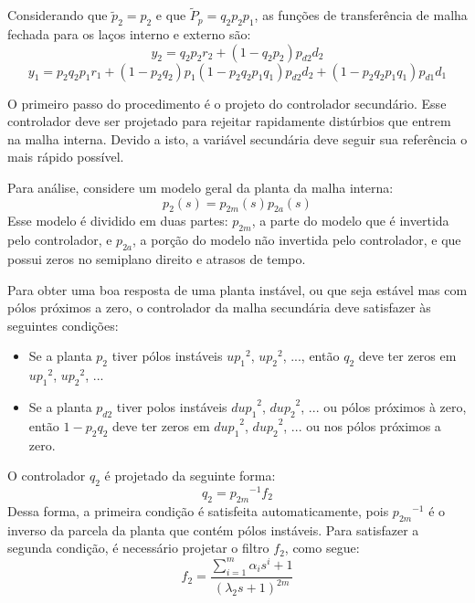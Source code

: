   Considerando que $\tilde{p}_2 = p_2$ e que $\tilde{P}_p = q_2 p_2 p_1$, as funções de transferência de malha fechada para os laços interno e externo são:
  \begin{equation}
    y_2 = q_2 p_2 r_2 + \left( 1- q_2 p_2 \right) p_{d2} d_2
  \end{equation}
  \begin{equation}
    y_1 = p_2 q_2 p_1 r_1 + \left( 1 - p_2 q_2 \right) p_1 \left(
      1 - p_2 q_2 p_1 q_1 \right) p_{d2} d_2 + \left( 1 - p_2 q_2 p_1 q_1
      \right) p_{d1} d_1
  \end{equation}

  O primeiro passo do procedimento é o projeto do controlador secundário. Esse controlador deve ser projetado para rejeitar rapidamente distúrbios que entrem na malha interna. Devido a isto, a variável secundária deve seguir sua referência o mais rápido possível.

  Para análise, considere um modelo geral da planta da malha interna:
  \begin{equation}
    p_2(s) = p_{2m}(s) p_{2a}(s)
  \end{equation}
  Esse modelo é dividido em duas partes: $p_{2m}$, a parte do modelo que é invertida pelo controlador, e $p_{2a}$, a porção do modelo não invertida pelo controlador, e que possui zeros no semiplano direito e atrasos de tempo.

  Para obter uma boa resposta de uma planta instável, ou que seja estável mas com pólos próximos a zero, o controlador da malha secundária deve satisfazer às seguintes condições:
  \begin{itemize}
    \item Se a planta $p_2$ tiver pólos instáveis
    	${up_1}^2$, ${up_2}^2$, ..., então $q_2$ deve ter zeros em
    	${up_1}^2$, ${up_2}^2$, ...
    \item Se a planta $p_{d2}$ tiver polos instáveis
    	${dup_1}^2$, ${dup_2}^2$, ... ou pólos próximos à zero, então
    	$1 - p_2 q_2$ deve ter zeros em ${dup_1}^2$, ${dup_2}^2$, ...
    	ou nos pólos próximos a zero.
  \end{itemize}

  O controlador $q_2$ é projetado da seguinte forma:
  \begin{equation}
    q_2 = {p_{2m}}^{-1} f_2
  \end{equation}
  Dessa forma, a primeira condição é satisfeita automaticamente, pois ${p_{2m}}^{-1}$ é o inverso da parcela da planta que contém pólos instáveis. Para satisfazer a segunda condição, é necessário projetar o filtro $f_2$, como segue:
  \begin{equation}
    f_2 = \frac{\sum_{i=1}^{m}
    	\alpha_i s^i + 1}{(\lambda_2 s + 1)^{2m}}
    \label{eq:filtro_f2}
  \end{equation}

